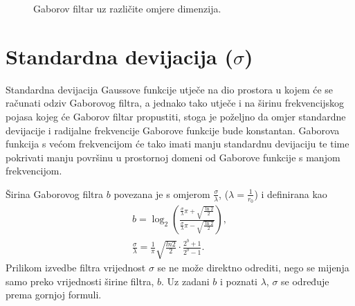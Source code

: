 \documentclass{ru}
\begin{document}
\begin{figure}[h!tb]
\centering
{}
\hspace{50pt}
\caption{Gaborov filtar uz različite omjere dimenzija.}
\label{fig:filter-ratios}
\end{figure}

\section{Standardna devijacija ($\sigma$)}
Standardna devijacija Gaussove funkcije utječe na dio prostora u kojem će se
računati odziv Gaborovog filtra, a jednako tako utječe i na širinu frekvencijskog
pojasa kojeg će Gaborov filtar propustiti, stoga je poželjno da omjer standardne
devijacije i radijalne frekvencije Gaborove funkcije bude konstantan. Gaborova
funkcija s većom frekvencijom će tako imati manju standardnu devijaciju te time
pokrivati manju površinu u prostornoj domeni od Gaborove funkcije s manjom
frekvencijom.


Širina Gaborovog filtra $b$ povezana je s omjerom
$\frac{\sigma}{\lambda}$, ($\lambda = \frac{1}{r_0}$) i definirana kao
\begin{eqnarray}
b = \log_2{\left ( \frac{\frac{\sigma}{\lambda}\pi + \sqrt{\frac{\ln2}{2}}}
{\frac{\sigma}{\lambda}\pi - \sqrt{\frac{\ln2}{2}}} \right )}, \\
\frac{\sigma}{\lambda} =
\frac{1}{\pi}\sqrt{\frac{ln2}{2}}\cdot\frac{2^b+1}{2^b-1}.
\end{eqnarray}
Prilikom izvedbe filtra vrijednost $\sigma$ se ne može direktno
odrediti, nego se mijenja samo preko vrijednosti širine filtra,
$b$. Uz zadani $b$ i poznati $\lambda$, $\sigma$ se određuje prema gornjoj
formuli.
 
\end{document}
